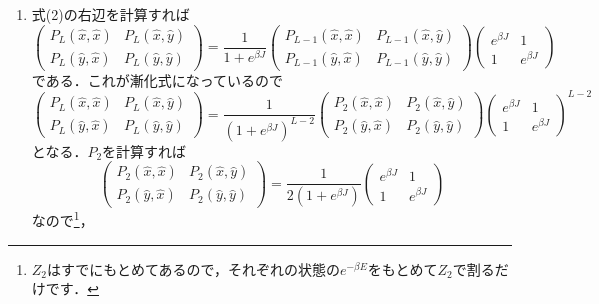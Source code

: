 \documentclass[a4paper,pdflatex,ja=standard]{bxjsarticle}
\begin{document}
\begin{enumerate}
  \item 
  式(2)の右辺を計算すれば
  \begin{equation}
    \begin{pmatrix}
        P_{L}(\hat{x},\hat{x}) & P_{L}(\hat{x},\hat{y}) \\
        P_{L}(\hat{y},\hat{x}) & P_{L}(\hat{y},\hat{y})
    \end{pmatrix}
    =
    \frac{1}{1+e^{\beta J}}
    \begin{pmatrix}
      P_{L-1}(\hat{x},\hat{x}) & P_{L-1}(\hat{x},\hat{y}) \\
      P_{L-1}(\hat{y},\hat{x}) & P_{L-1}(\hat{y},\hat{y})
    \end{pmatrix}
    \begin{pmatrix}
      e^{\beta J} & 1 \\
      1 & e^{\beta J}
    \end{pmatrix}
  \end{equation}
  である．これが漸化式になっているので
  \begin{equation}
    \begin{pmatrix}
      P_{L}(\hat{x},\hat{x}) & P_{L}(\hat{x},\hat{y}) \\
      P_{L}(\hat{y},\hat{x}) & P_{L}(\hat{y},\hat{y})
    \end{pmatrix}
    =
    \frac{1}{(1+e^{\beta J})^{L-2}}
    \begin{pmatrix}
      P_{2}(\hat{x},\hat{x}) & P_{2}(\hat{x},\hat{y}) \\
      P_{2}(\hat{y},\hat{x}) & P_{2}(\hat{y},\hat{y})
    \end{pmatrix}    
    \begin{pmatrix}
      e^{\beta J} & 1 \\
      1 & e^{\beta J}
    \end{pmatrix}^{L-2}
  \end{equation}
  となる．$P_{2}$を計算すれば
  \begin{equation}
    \begin{pmatrix}
      P_{2}(\hat{x},\hat{x}) & P_{2}(\hat{x},\hat{y}) \\
      P_{2}(\hat{y},\hat{x}) & P_{2}(\hat{y},\hat{y})
    \end{pmatrix}    
    =
    \frac{1}{2(1+e^{\beta J})}
    \begin{pmatrix}
      e^{\beta J} & 1 \\
      1 & e^{\beta J}
    \end{pmatrix}
  \end{equation}
  なので\footnote{$Z_{2}$はすでにもとめてあるので，それぞれの状態の$e^{-\beta E}$をもとめて$Z_{2}$で割るだけです．}，

\end{enumerate}
\end{document}
